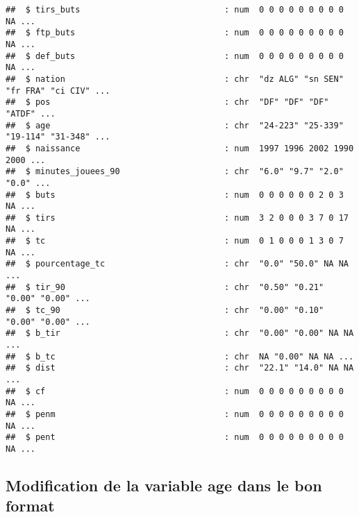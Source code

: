 \documentclass[7pt,]{report}
\begin{document}
\begin{verbatim}
##  $ tirs_buts                             : num  0 0 0 0 0 0 0 0 0 NA ...
##  $ ftp_buts                              : num  0 0 0 0 0 0 0 0 0 NA ...
##  $ def_buts                              : num  0 0 0 0 0 0 0 0 0 NA ...
##  $ nation                                : chr  "dz ALG" "sn SEN" "fr FRA" "ci CIV" ...
##  $ pos                                   : chr  "DF" "DF" "DF" "ATDF" ...
##  $ age                                   : chr  "24-223" "25-339" "19-114" "31-348" ...
##  $ naissance                             : num  1997 1996 2002 1990 2000 ...
##  $ minutes_jouees_90                     : chr  "6.0" "9.7" "2.0" "0.0" ...
##  $ buts                                  : num  0 0 0 0 0 0 2 0 3 NA ...
##  $ tirs                                  : num  3 2 0 0 0 3 7 0 17 NA ...
##  $ tc                                    : num  0 1 0 0 0 1 3 0 7 NA ...
##  $ pourcentage_tc                        : chr  "0.0" "50.0" NA NA ...
##  $ tir_90                                : chr  "0.50" "0.21" "0.00" "0.00" ...
##  $ tc_90                                 : chr  "0.00" "0.10" "0.00" "0.00" ...
##  $ b_tir                                 : chr  "0.00" "0.00" NA NA ...
##  $ b_tc                                  : chr  NA "0.00" NA NA ...
##  $ dist                                  : chr  "22.1" "14.0" NA NA ...
##  $ cf                                    : num  0 0 0 0 0 0 0 0 0 NA ...
##  $ penm                                  : num  0 0 0 0 0 0 0 0 0 NA ...
##  $ pent                                  : num  0 0 0 0 0 0 0 0 0 NA ...
\end{verbatim}

\hypertarget{modification-de-la-variable-age-dans-le-bon-format}{%
\subsection{Modification de la variable age dans le bon format}\label{modification-de-la-variable-age-dans-le-bon-format}}
\end{document}
